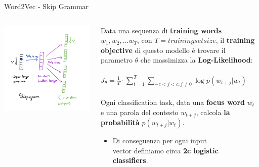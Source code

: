 \documentclass[british]{beamer}
\begin{document}
\begin{frame}{Word2Vec - Skip Grammar}
	\begin{columns}
		\begin{column}{0.4\textwidth}
			\includegraphics[width=1.2\linewidth,height=1.4\textwidth]{./Imgs/skip.png}
		\end{column}
		\begin{column}{0.6\textwidth}
			Data una sequenza di \textbf{training words} \(w_1, w_2, ... w_T\), con \(T = trainingsetsize\), il \textbf{training objective} di questo modello \`{e} trovare il parametro \(\theta\) che massimizza la \textbf{Log-Likelihood}:
			\\~\\
			\(J_{\theta} =	\frac{1}{T}\cdot\sum_{t=1}^{T}\sum_{-c<j<c,j\neq0}\log p(w_{t+j}|w_{t})\)
			\\~\\
			Ogni classification task, data una \textbf{focus word} \(w_t\) e una parola del contesto \(w_{t+j}\), calcola \textbf{la probabilit\`{a}} \(p(w_{t+j}|w_{t})\).
			\begin{itemize}
				\item Di conseguenza per ogni input \\vector definiamo circa \textbf{2c logistic\\ classifiers}.
			\end{itemize}
		\end{column}
	\end{columns}
\end{frame}
\end{document}
